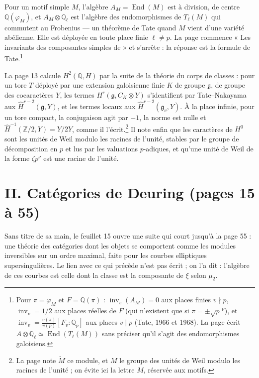 \documentclass[11pt,a4paper]{article}
\begin{document}
Pour un motif simple $M$, l'algèbre $A_{M} = \operatorname{End}(M)$ est à
division, de centre $\mathbb{Q}(\varphi_{M})$, et $A_{M} \otimes \mathbb{Q}_{\ell}$
est l'algèbre des endomorphismes de $T_{\ell}(M)$ qui commutent au Frobenius
--- un théorème de Tate quand $M$ vient d'une variété abélienne. Elle est
déployée en toute place finie $\ell \neq p$. La page commence « Les invariants
des composantes simples de » et s'arrête : la réponse est la formule de
Tate.\footnote{Pour $\pi = \varphi_{M}$ et $F = \mathbb{Q}(\pi)$ :
$\operatorname{inv}_{v}(A_{M}) = 0$ aux places finies $v \nmid p$,
$\operatorname{inv}_{v} = 1/2$ aux places réelles de $F$ (qui n'existent que si
$\pi = \pm\sqrt{p}^{\,\nu}$), et $\operatorname{inv}_{v} = \frac{v(\pi)}{v(p)}
[F_{v} : \mathbb{Q}_{p}]$ aux places $v \mid p$ (Tate, 1966 et 1968). La page
écrit $A \otimes \mathbb{Q}_{\ell} \simeq \operatorname{End}(T_{\ell}(M))$ sans
préciser qu'il s'agit des endomorphismes galoisiens.}

La page 13 calcule $H^{2}(\mathbb{Q}, H)$ par la suite de la théorie du corps de
classes : pour un tore $T$ déployé par une extension galoisienne finie $K$ de
groupe $\mathfrak{g}$, de groupe des cocaractères $Y$, les termes
$H^{r}(\mathfrak{g}, C_{K} \otimes Y)$ s'identifient par Tate--Nakayama aux
$\widehat{H}^{r-2}(\mathfrak{g}, Y)$, et les termes locaux aux
$\widehat{H}^{r-2}(\mathfrak{g}_{v}, Y)$. À la place infinie, pour un tore
compact, la conjugaison agit par $-1$, la norme est nulle et
$\widehat{H}^{-1}(\mathbb{Z}/2, Y) = Y/2Y$, comme il l'écrit.\footnote{La page
note $\check{M}$ ce module, et $M$ le groupe des unités de Weil modulo les
racines de l'unité ; on évite ici la lettre $M$, réservée aux motifs.} Il note
enfin que les caractères de $H^{0}$ sont les unités de Weil modulo les racines
de l'unité, stables par le groupe de décomposition en $p$ et lus par les
valuations $p$-adiques, et qu'une unité de Weil de la forme $\zeta p^{\nu}$ est
une racine de l'unité.

\section*{II. Catégories de Deuring (pages 15 à 55)}

Sans titre de sa main, le feuillet 15 ouvre une suite qui court jusqu'à la page
55 : une théorie des catégories dont les objets se comportent comme les
modules inversibles sur un ordre maximal, faite pour les courbes elliptiques
supersingulières. Le lien avec ce qui précède n'est pas écrit ; on l'a dit :
l'algèbre de ces courbes est celle dont la classe est la composante de $\xi$
selon $\mu_{2}$.
\end{document}
